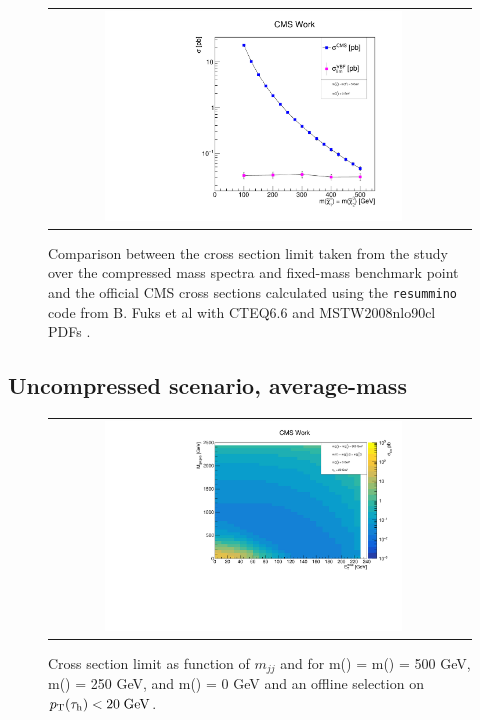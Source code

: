 \begin{figure}[tbh!]
	\centering
	\begin{tabular}{cc}
		\includegraphics[width=0.75\textwidth]{analysis/pics/out_xsecmin_lsp000_stauclose.pdf}
	\end{tabular}
	\caption{Comparison between the cross section limit taken from the study over the compressed mass spectra and fixed-\stau mass benchmark point and the official CMS cross sections calculated using the \texttt{resummino} code from B. Fuks et al with CTEQ6.6 and MSTW2008nlo90cl PDFs \cite{Fuks:2013vua}.}
	\label{fig::out_xsecmin_lsp050_stauclose}
\end{figure}


\FloatBarrier

\subsection*{Uncompressed scenario, average-\stau mass}


\begin{figure}[tbh!]
	\centering
	\begin{tabular}{cc}
		\includegraphics[width=0.75\textwidth]{analysis/pics/JetInvMass_vs_MET_xseclim_Chargino500_Stau250_LSP000_taupt20.pdf}
	\end{tabular}
	\caption{Cross section limit as function of $m_{jj}$ and \met for m(\charginopm) = m(\neutralinotwo) = 500 GeV,  m(\stau) = 250 GeV, and m(\neutralinoone) = 0 GeV and an offline selection on $p_{\text{T}}(\tau_{\text{h}}) <  20\;\text{Ge}\kern-0.06667em\text{V}$.}
	\label{fig::JetInvMass_vs_MET_xseclim_Chargino500_Stau250_LSP000_taupt20}
\end{figure}

